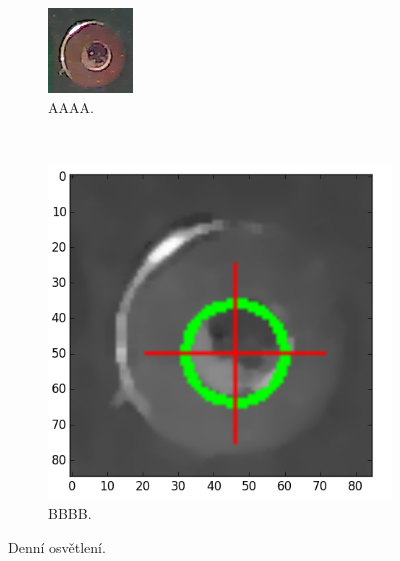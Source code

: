 \begin{figure}[H]
	\centering
	\begin{subfigure}[b]{0.4\textwidth}
		\centering
		\includegraphics[width=0.7\linewidth, trim = 0cm -0.2cm 0cm 0cm]{obrazky/fiduc_denni_crop.png}%
		\caption{AAAA.}
		\label{fig:denni}
	\end{subfigure}
	~
	\begin{subfigure}[b]{0.4\textwidth}
		\centering
		\includegraphics[width=0.8\linewidth]{obrazky/fiduc_denni_crop3.png}%
		\caption{BBBB.}
		\label{fig:denni2}
	\end{subfigure}

	\caption{Denní osvětlení.}
\end{figure}



